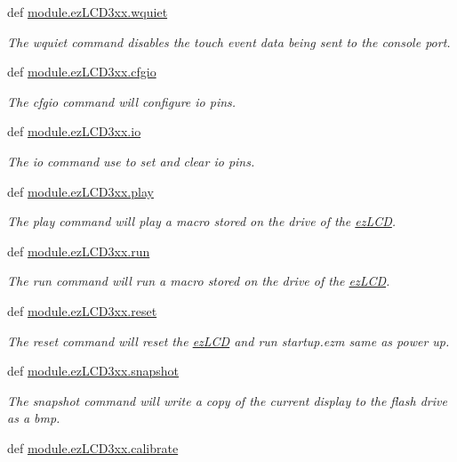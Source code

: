 \begin{DoxyCompactItemize}
def \hyperlink{group___general_gae760b8839f85e30c2a294a593e77b9d7}{module.\-ez\-L\-C\-D3xx.\-wquiet}
\begin{DoxyCompactList}\small\item\em The wquiet command disables the touch event data being sent to the console port. \end{DoxyCompactList}\item 
def \hyperlink{group___general_ga84837123679c1b262b8bb29108019dda}{module.\-ez\-L\-C\-D3xx.\-cfgio}
\begin{DoxyCompactList}\small\item\em The cfgio command will configure io pins. \end{DoxyCompactList}\item 
def \hyperlink{group___general_gad7ece2d1355d0be3f7df9ce216cb5286}{module.\-ez\-L\-C\-D3xx.\-io}
\begin{DoxyCompactList}\small\item\em The io command use to set and clear io pins. \end{DoxyCompactList}\item 
def \hyperlink{group___general_ga7d904406a210cad98e2d762dae76d553}{module.\-ez\-L\-C\-D3xx.\-play}
\begin{DoxyCompactList}\small\item\em The play command will play a macro stored on the drive of the \hyperlink{classmodule_1_1ez_l_c_d3xx_1_1ez_l_c_d}{ez\-L\-C\-D}. \end{DoxyCompactList}\item 
def \hyperlink{group___general_ga0535965cf75c9a6f4f6039a1d1399d81}{module.\-ez\-L\-C\-D3xx.\-run}
\begin{DoxyCompactList}\small\item\em The run command will run a macro stored on the drive of the \hyperlink{classmodule_1_1ez_l_c_d3xx_1_1ez_l_c_d}{ez\-L\-C\-D}. \end{DoxyCompactList}\item 
def \hyperlink{group___general_gad09d3f52045f116eb41726211f8909a4}{module.\-ez\-L\-C\-D3xx.\-reset}
\begin{DoxyCompactList}\small\item\em The reset command will reset the \hyperlink{classmodule_1_1ez_l_c_d3xx_1_1ez_l_c_d}{ez\-L\-C\-D} and run startup.\-ezm same as power up. \end{DoxyCompactList}\item 
def \hyperlink{group___general_gaf906c49e26bdd7b09f58d80675a0d4f5}{module.\-ez\-L\-C\-D3xx.\-snapshot}
\begin{DoxyCompactList}\small\item\em The snapshot command will write a copy of the current display to the flash drive as a bmp. \end{DoxyCompactList}\item 
\hypertarget{group___general_ga44f3daeee41eaaf35752594e6543a619}{def \hyperlink{group___general_ga44f3daeee41eaaf35752594e6543a619}{module.\-ez\-L\-C\-D3xx.\-calibrate}}\label{dd/d0a/group___general_ga44f3daeee41eaaf35752594e6543a619}


\end{DoxyCompactItemize}

